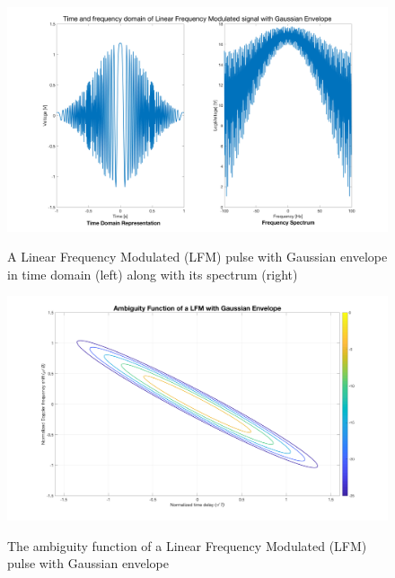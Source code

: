 \begin{figure}[H]
\centering
{\includegraphics[scale=0.18]{usp8_3.png}}
\caption{ A Linear Frequency Modulated (LFM) pulse with Gaussian envelope in time domain (left) along with its spectrum (right)}
\end{figure}

\begin{figure}[H]
\centering
{\includegraphics[scale=0.18]{usp8_6.png}}
\caption{ The ambiguity function of a Linear Frequency Modulated (LFM) pulse with Gaussian envelope }
\end{figure}

